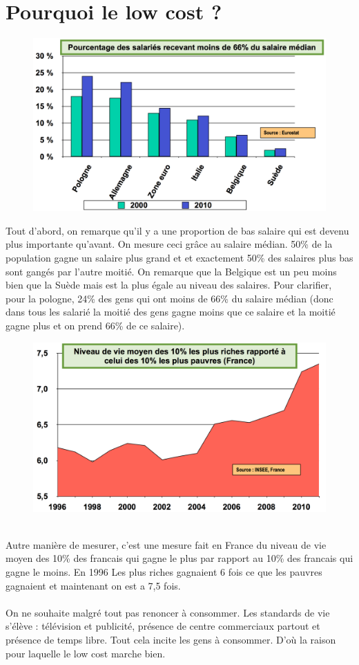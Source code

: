 \section{Pourquoi le low cost ?}
\begin{figure}
\includegraphics[scale=0.3]{64}
\end{figure}
\noindent Tout d'abord, on remarque qu'il y a une proportion de bas salaire qui est devenu plus importante qu’avant. On mesure ceci grâce au salaire médian. 50\% de la population gagne un salaire plus grand et et exactement 50\% des salaires plus bas sont gangés par l'autre moitié. On remarque que la Belgique est un peu moins bien que la Suède mais est la plus égale au niveau des salaires. Pour clarifier, pour la pologne, 24\% des gens qui ont moins de 66\% du salaire médian (donc dans tous les salarié la moitié des gens gagne moins que ce salaire et la moitié gagne plus et on prend 66\% de ce salaire).

\begin{figure}
\includegraphics[scale=0.3]{65}
\end{figure}
\ \\
 Autre manière de mesurer, c’est une mesure fait en France du niveau de vie moyen des 10\% des francais qui gagne le plus par rapport au 10\% des francais qui gagne le moins. En 1996 Les plus riches gagnaient 6 fois ce que les pauvres gagnaient et maintenant on est a 7,5 fois.\\\\
On ne souhaite malgré tout pas renoncer à consommer. Les standards de vie s’élève : télévision et publicité, présence de centre commerciaux partout et présence de temps libre. Tout cela incite les gens à consommer. D'où la raison pour laquelle le low cost marche bien.


